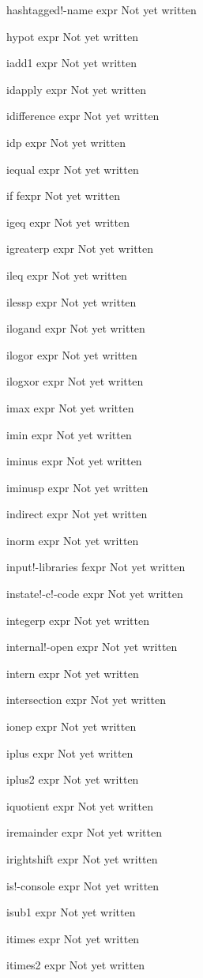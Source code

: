 \documentclass[a4paper,11pt]{article}
\begin{document}
\begin{description}
hashtagged!-name expr
Not yet written

hypot expr
Not yet written

iadd1 expr
Not yet written

idapply expr
Not yet written

idifference expr
Not yet written

idp expr
Not yet written

iequal expr
Not yet written

if fexpr
Not yet written

igeq expr
Not yet written

igreaterp expr
Not yet written

ileq expr
Not yet written

ilessp expr
Not yet written

ilogand expr
Not yet written

ilogor expr
Not yet written

ilogxor expr
Not yet written

imax expr
Not yet written

imin expr
Not yet written

iminus expr
Not yet written

iminusp expr
Not yet written

indirect expr
Not yet written

inorm expr
Not yet written

input!-libraries fexpr
Not yet written

instate!-c!-code expr
Not yet written

integerp expr
Not yet written

internal!-open expr
Not yet written

intern expr
Not yet written

intersection expr
Not yet written

ionep expr
Not yet written

iplus expr
Not yet written

iplus2 expr
Not yet written

iquotient expr
Not yet written

iremainder expr
Not yet written

irightshift expr
Not yet written

is!-console expr
Not yet written

isub1 expr
Not yet written

itimes expr
Not yet written

itimes2 expr
Not yet written


\end{description}
\end{document}
